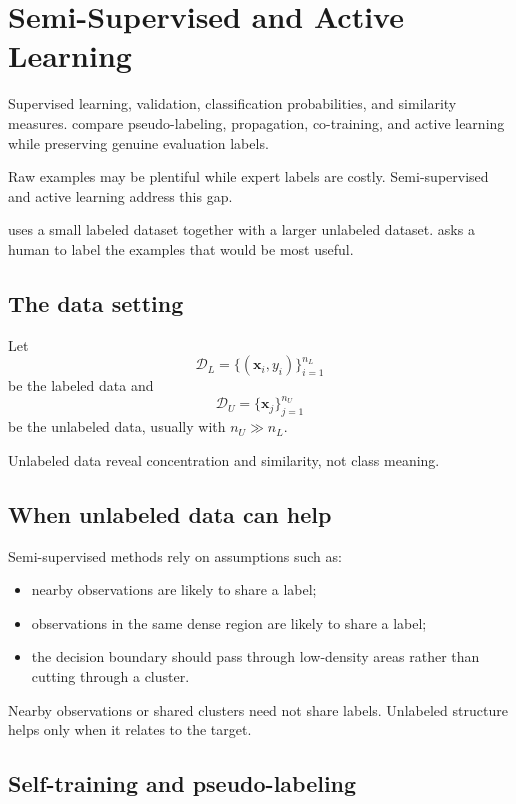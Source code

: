 \chapter{Semi-Supervised and Active Learning}
\label{ch:semi-supervised}

\chapterguide%
  {Supervised learning, validation, classification probabilities, and similarity measures.}
  {compare pseudo-labeling, propagation, co-training, and active learning while preserving genuine evaluation labels.}

Raw examples may be plentiful while expert labels are costly. Semi-supervised and active learning address this gap.

 uses a small labeled dataset together with a larger unlabeled dataset.  asks a human to label the examples that would be most useful.

\section{The data setting}

Let
\[
  \mathcal{D}_L=\{(\bm{x}_i,y_i)\}_{i=1}^{n_L}
\]
be the labeled data and
\[
  \mathcal{D}_U=\{\bm{x}_j\}_{j=1}^{n_U}
\]
be the unlabeled data, usually with $n_U\gg n_L$.

Unlabeled data reveal concentration and similarity, not class meaning.

\section{When unlabeled data can help}

Semi-supervised methods rely on assumptions such as:

\begin{itemize}
  \item nearby observations are likely to share a label;
  \item observations in the same dense region are likely to share a label;
  \item the decision boundary should pass through low-density areas rather than cutting through a cluster.
\end{itemize}

Nearby observations or shared clusters need not share labels. Unlabeled structure helps only when it relates to the target.

\section{Self-training and pseudo-labeling}

